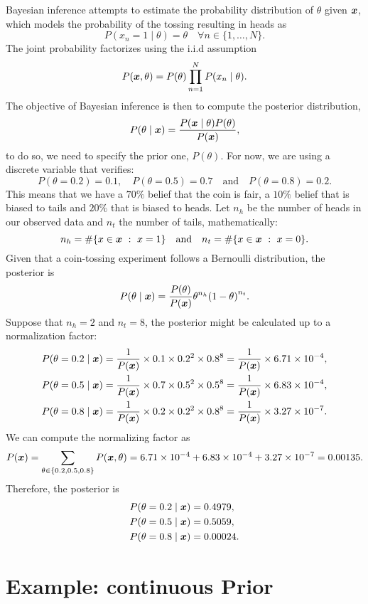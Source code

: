 Bayesian inference attempts to estimate the probability distribution of \(\theta\) given \(\bm{x}\), which models the probability of the tossing resulting in heads as
\[
P(x_n = 1  \mid  \theta) = \theta \quad \forall n \in \{1,\dots,N\}.
\]
The joint probability factorizes using the i.i.d assumption
\[
  P(\bm{x},\theta) = P(\theta)\prod_{n=1}^N P(x_n \mid \theta).
\]
The objective of Bayesian inference is then to compute the posterior distribution,
\[
  P(\theta \mid \bm{x}) = \frac{P(\bm{x} \mid \theta)P(\theta)}{P(\bm{x})},
\]
to do so, we need to specify the prior one, \(P(\theta)\). For now, we are using a discrete variable that verifies:
\[
  P(\theta = 0.2) = 0.1, \quad P(\theta = 0.5) = 0.7 \quad \text{and} \quad P(\theta = 0.8) = 0.2.
\]
This means that we have a \(70\%\) belief that the coin is fair, a \(10\%\)
belief that is biased to tails and \(20\%\) that is biased to heads. Let \(n_h\) be the number of heads in our observed data and \(n_t\)
the number of tails, mathematically:
\[
  n_{h} = \#\{x \in \bm{x} \ : \ x = 1\} \quad \text{and} \quad n_{t} = \#\{x \in \bm{x} \ : \ x = 0\}.
\]
Given that a coin-tossing experiment follows a Bernoulli distribution, the posterior is
\[
  P(\theta  \mid \bm{x}) = \frac{P(\theta)}{P(\bm{x})} \theta^{n_h}{(1-\theta)}^{n_t}.
\]
Suppose that \(n_h = 2\) and \(n_t = 8\), the posterior might be calculated up to a normalization factor:
\[
\begin{aligned}
  P(\theta = 0.2  \mid  \bm{x}) &= \frac{1}{P(\bm{x})}\times 0.1 \times 0.2^{2}
  \times 0.8^{8} = \frac{1}{P(\bm{x})} \times 6.71\times10^{-4}, \\
   P(\theta = 0.5  \mid  \bm{x}) &= \frac{1}{P(\bm{x})}\times 0.7 \times 0.5^{2}
   \times 0.5^{8} = \frac{1}{P(\bm{x})} \times 6.83\times10^{-4},\\
    P(\theta = 0.8  \mid  \bm{x}) &= \frac{1}{P(\bm{x})}\times 0.2 \times 0.2^{2}
  \times 0.8^{8} = \frac{1}{P(\bm{x})} \times 3.27\times10^{-7}.
\end{aligned}
\]
We can compute the normalizing factor as
\[
   P(\bm{x}) = \sum_{\theta \in \{0.2, 0.5, 0.8\}} P(\bm{x}, \theta) =   6.71\times10^{-4} +   6.83\times10^{-4} +
   3.27\times10^{-7} = 0.00135.
 \]
Therefore, the posterior is
\[
\begin{aligned}
  P(\theta = 0.2  \mid  \bm{x}) &= 0.4979,\\
  P(\theta = 0.5  \mid  \bm{x}) &= 0.5059,\\
  P(\theta = 0.8  \mid  \bm{x}) &= 0.00024.
\end{aligned}
\]

\section{Example: continuous Prior}

